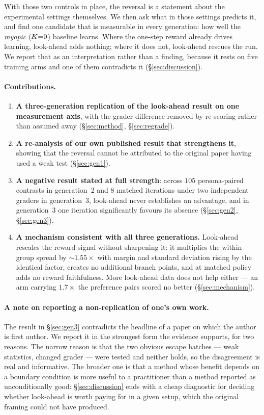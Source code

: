 With those two controls in place, the reversal is a statement about the experimental
settings themselves. We then ask what in those settings predicts it, and find one candidate
that is measurable in every generation: how well the \emph{myopic} ($K{=}0$) baseline
learns. Where the one-step reward already drives learning, look-ahead adds nothing; where
it does not, look-ahead rescues the run. We report that as an interpretation rather than a
finding, because it rests on five training arms and one of them contradicts it
(\S\ref{sec:discussion}).

\paragraph{Contributions.}
\begin{enumerate}\itemsep3pt
  \item \textbf{A three-generation replication of the look-ahead result on one measurement
  axis}, with the grader difference removed by re-scoring rather than assumed away
  (\S\ref{sec:method}, \S\ref{sec:regrade}).

  \item \textbf{A re-analysis of our own published result that strengthens it}, showing
  that the reversal cannot be attributed to the original paper having used a weak test
  (\S\ref{sec:gen1}).

  \item \textbf{A negative result stated at full strength}: across $105$ persona-paired
  contrasts in generation~2 and $8$ matched iterations under two independent graders in
  generation~3, look-ahead never establishes an advantage, and in generation~3 one
  iteration significantly favours its absence (\S\ref{sec:gen2}, \S\ref{sec:gen3}).

  \item \textbf{A mechanism consistent with all three generations.} Look-ahead rescales the
  reward signal without sharpening it: it multiplies the within-group spread by
  ${\sim}1.55\times$ with margin and standard deviation rising by the identical factor,
  creates no additional branch points, and at matched policy adds no reward faithfulness.
  More look-ahead data does not help either --- an arm carrying $1.7\times$ the preference
  pairs scored no better (\S\ref{sec:mechanism}).
\end{enumerate}

\paragraph{A note on reporting a non-replication of one's own work.}
The result in \S\ref{sec:gen3} contradicts the headline of a paper on which the author is
first author. We report it in the strongest form the evidence supports, for two reasons.
The narrow reason is that the two obvious escape hatches --- weak statistics, changed
grader --- were tested and neither holds, so the disagreement is real and informative. The
broader one is that a method whose benefit depends on a boundary condition is more useful
to a practitioner than a method reported as unconditionally good: \S\ref{sec:discussion}
ends with a cheap diagnostic for deciding whether look-ahead is worth paying for in a given
setup, which the original framing could not have produced.
